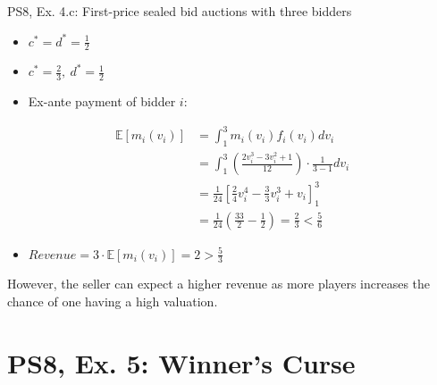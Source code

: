 \begin{frame}{PS8, Ex. 4.c: First-price sealed bid auctions with three bidders}
\begin{multicols}{2}
\begin{itemize}
        \item[(3.a)] $c^*=d^*=\frac{1}{2}$
        \item[(4.a)] $c^*=\frac{2}{3},\ d^*=\frac{1}{2}$
        \item[\nth{2}:] Ex-ante payment of bidder $i$:
      \end{itemize}
      \vspace{-12pt}
      \begin{align*}
        \mathbb{E}[m_i(v_i)]&=\textstyle\int_1^3m_i(v_i)f_i(v_i)dv_i\\
                            &=\textstyle\int_1^3\left(\frac{2v_i^3-3v_i^2+1}{12}\right)\cdot\frac{1}{3-1}dv_i\\
                            &=\frac{1}{24}\left[\frac{2}{4}v_i^4-\frac{3}{3}v_i^3+v_i\right]_1^3\\
                            &=\frac{1}{24}\left(\frac{33}{2}-\frac{1}{2}\right)=\frac{2}{3}<\frac{5}{6}
      \end{align*}
      \vspace{-16pt}
      \begin{itemize}
        \item[\nth{3}:] $Revenue=3\cdot\mathbb{E}[m_i(v_i)]=2>\frac{5}{3}$
      \end{itemize}
      \vspace{-6pt}
      However, the seller can expect a higher revenue as more players increases the chance of one having a high valuation.
      \vfill\null
    \end{multicols}
    \vfill\null
\end{frame}



\section{PS8, Ex. 5: Winner's Curse}

